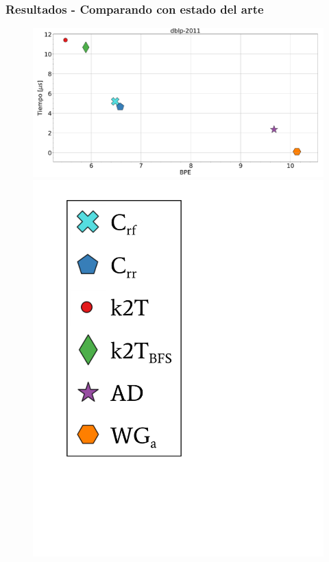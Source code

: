 \begin{frame}
\frametitle{Resultados - Comparando con estado del arte}

\begin{figure}
	\centering
	
    	\begin{minipage}{1\textwidth}
    		\centering
    		\begin{minipage}{0.8\textwidth}
    			\centering
    			\includegraphics[width=1\linewidth]{../img/bpeTimes/aleatorio/dblp-2011.pdf}
    		\end{minipage}
    		\begin{minipage}{0.15\textwidth}
    			\centering
    			\includegraphics[scale=.16, clip, trim=70 200 280 40]{../img/bpeTimes/labelAle.pdf}
    		\end{minipage}	
    	\end{minipage}


\end{figure}
\end{frame}
